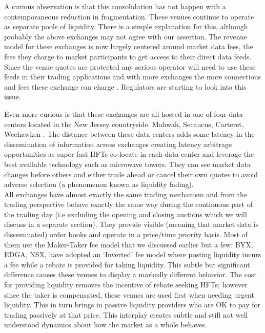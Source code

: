 A curious observation is that this consolidation has not happen with a contemporaneous reduction in fragmentation. These venues continue to operate as separate pools of liquidity. There is a simple explanation for this, although probably the above exchanges may not agree with our assertion. The revenue model for these exchanges is now largely centered around market data fees, the fees they charge to market participants to get access to their direct data feeds. Since the venue quotes are protected any serious operator will need to use these feeds in their trading applications and with more exchanges the more connections and fees these exchange can charge . Regulators are starting to look into this issue.

Even more curious is that these exchanges are all hosted in one of four data centers located in the New Jersey countryside: Mahwah, Secaucus, Carteret, Weehawken . The distance between these data centers adds some latency in the dissemination of information across exchanges creating latency arbitrage opportunities as super fast HFTs co-locate in each data center and leverage the best available technology such as microwave towers. They can see market data changes before others and either trade ahead or cancel their own quotes to avoid adverse selection (a phenomenon known as liquidity fading).\\


All exchanges have almost exactly the same trading mechanism and from the trading perspective behave exactly the same way during the continuous part of the trading day (i.e excluding the opening and closing auctions which we will discuss in a separate section). They provide visible (meaning that market data is disseminated) order books and operate in a price/time priority basis. Most of them use the Maker-Taker fee model that we discussed earlier but a few: BYX, EDGA, NSX, have adopted an `Inverted' fee model where posting liquidity incurs a fee while a rebate is provided for taking liquidity. This subtle but significant difference causes these venues to display a markedly different behavior. The cost for providing liquidity removes the incentive of rebate seeking HFTs; however since the taker is compensated, these venues are used first when needing urgent liquidity. This in turn brings in passive liquidity providers who are OK to pay for trading passively at that price. This interplay creates subtle and still not well understood dynamics about how the market as a whole behaves.


